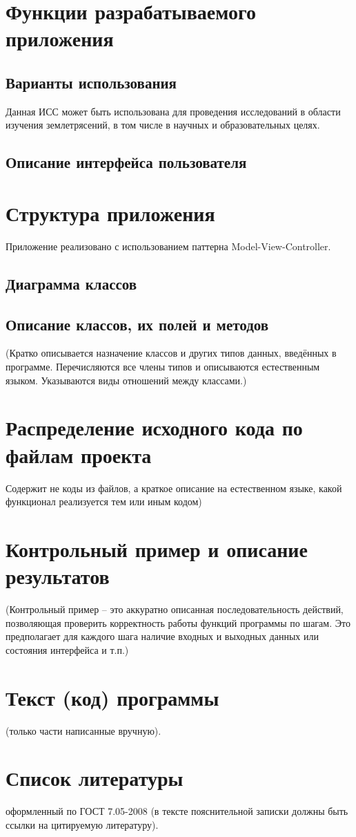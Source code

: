\documentclass[a4paper,12pt, fleqn]{article}
\theoremstyle{plain} %
\theoremstyle{definition} %
\theoremstyle{remark} %
\numberwithin{equation}{section}
\begin{document}
\section{Функции разрабатываемого приложения}

\subsection{Варианты использования}
Данная ИСС может быть использована для проведения исследований в области изучения землетрясений, в том числе в научных и образовательных целях.

\subsection{Описание интерфейса пользователя}


\section{Структура приложения}
Приложение реализовано с использованием паттерна Model-View-Controller.
\subsection{Диаграмма классов}

\subsection{Описание классов, их полей и методов}
(Кратко описывается назначение классов и других типов данных, введённых в программе. Перечисляются все члены типов и описываются естественным языком. Указываются виды отношений между классами.)


\section{Распределение исходного кода по файлам проекта}
Содержит не коды из файлов, а краткое описание на естественном языке, какой функционал реализуется тем или иным кодом)


\section{Контрольный пример и описание результатов}
(Контрольный пример – это аккуратно описанная последовательность действий, позволяющая проверить корректность работы функций программы по шагам. Это предполагает для каждого шага наличие входных и выходных данных или состояния интерфейса и т.п.)


\section{Текст (код) программы}
(только части написанные вручную).


\section{Список литературы}
оформленный по ГОСТ 7.05-2008 (в тексте пояснительной записки должны быть ссылки на цитируемую литературу). 
\end{document}

